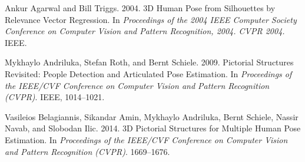 \documentclass[sigconf]{acmart}
\begin{document}
\begin{thebibliography}{46}



\ifx \showCODEN    \undefined {}     \fi
\ifx \showDOI      \undefined \def \showDOI       #1{#1}\fi
\ifx \showISBNx    \undefined \def \showISBNx     #1{\unskip}     \fi
\ifx \showISBNxiii \undefined \def \showISBNxiii  #1{\unskip}     \fi
\ifx \showISSN     \undefined \def \showISSN      #1{\unskip}     \fi
\ifx \showLCCN     \undefined \def \showLCCN      #1{\unskip}     \fi
\ifx \shownote     \undefined \def \shownote      #1{#1}          \fi
\ifx \showarticletitle \undefined \def \showarticletitle #1{#1}   \fi
\ifx \showURL      \undefined \def \showURL       {\relax}        \fi
\providecommand\bibfield[2]{#2}
\providecommand\bibinfo[2]{#2}
\providecommand\natexlab[1]{#1}
\providecommand\showeprint[2][]{arXiv:#2}

\bibfield{author}{\bibinfo{person}{Ankur Agarwal} {and} \bibinfo{person}{Bill
  Triggs}.} \bibinfo{year}{2004}\natexlab{}.
\newblock \showarticletitle{3D Human Pose from Silhouettes by Relevance Vector
  Regression}. In \bibinfo{booktitle}{\emph{Proceedings of the 2004 IEEE
  Computer Society Conference on Computer Vision and Pattern Recognition, 2004.
  CVPR 2004.}} IEEE.
\newblock


\bibfield{author}{\bibinfo{person}{Mykhaylo Andriluka}, \bibinfo{person}{Stefan
  Roth}, {and} \bibinfo{person}{Bernt Schiele}.}
  \bibinfo{year}{2009}\natexlab{}.
\newblock \showarticletitle{Pictorial Structures Revisited: People Detection
  and Articulated Pose Estimation}. In \bibinfo{booktitle}{\emph{Proceedings of
  the IEEE/CVF Conference on Computer Vision and Pattern Recognition (CVPR)}}.
  IEEE, \bibinfo{pages}{1014--1021}.
\newblock


\bibfield{author}{\bibinfo{person}{Vasileios Belagiannis},
  \bibinfo{person}{Sikandar Amin}, \bibinfo{person}{Mykhaylo Andriluka},
  \bibinfo{person}{Bernt Schiele}, \bibinfo{person}{Nassir Navab}, {and}
  \bibinfo{person}{Slobodan Ilic}.} \bibinfo{year}{2014}\natexlab{}.
\newblock \showarticletitle{3D Pictorial Structures for Multiple Human Pose
  Estimation}. In \bibinfo{booktitle}{\emph{Proceedings of the IEEE/CVF
  Conference on Computer Vision and Pattern Recognition (CVPR)}}.
  \bibinfo{pages}{1669--1676}.
\newblock



\end{thebibliography}
\end{document}
